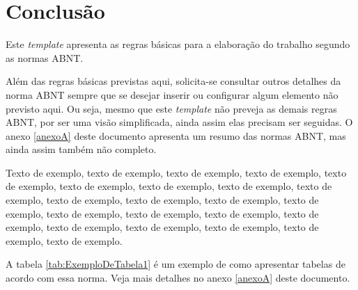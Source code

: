 \documentclass[
	12pt,				%
	oneside,			%
	a4paper,			%
	english,			%
	brazil				%
	]{abntex2ppgsi}
\begin{document}
\chapter{Conclusão}

Este \textit{template} apresenta as regras básicas para a elaboração do trabalho segundo as normas ABNT.


Além das regras básicas previstas aqui, solicita-se consultar outros detalhes da norma ABNT sempre que se desejar inserir ou configurar algum elemento não previsto aqui. Ou seja, mesmo que este \textit{template} não preveja as demais regras ABNT, por ser uma visão simplificada, ainda assim elas precisam ser seguidas. O anexo \ref{anexoA} deste documento apresenta um resumo das normas ABNT, mas ainda assim também não completo.

Texto de exemplo, texto de exemplo, texto de exemplo, texto de exemplo, texto de exemplo, texto de exemplo, texto de exemplo, texto de exemplo, texto de exemplo, texto de exemplo, texto de exemplo, texto de exemplo, texto de exemplo, texto de exemplo, texto de exemplo, texto de exemplo, texto de exemplo, texto de exemplo, texto de exemplo, texto de exemplo, texto de exemplo, texto de exemplo.  

A tabela \ref{tab:ExemploDeTabela1} é um exemplo de como apresentar tabelas de acordo com essa norma. Veja mais detalhes no anexo \ref{anexoA} deste documento.
\end{document}
